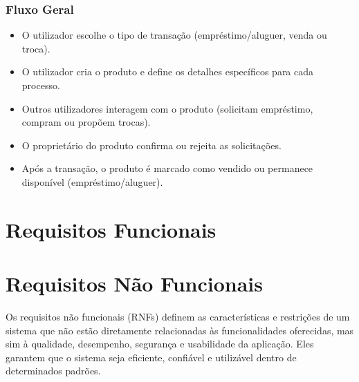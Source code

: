 \documentclass[a4paper, 12pt]{article} %
\begin{document}
\subsubsection{Fluxo Geral}
\begin{itemize}
	\item O utilizador escolhe o tipo de transação (empréstimo/aluguer, venda ou troca).
	\item O utilizador cria o produto e define os detalhes específicos para cada processo.
	\item Outros utilizadores interagem com o produto (solicitam empréstimo, compram ou propõem trocas).
	\item O proprietário do produto confirma ou rejeita as solicitações.
	\item Após a transação, o produto é marcado como vendido ou permanece disponível (empréstimo/aluguer).
\end{itemize}


\newpage
\section{Requisitos Funcionais}



\newpage
\section{Requisitos Não Funcionais}

Os requisitos não funcionais (RNFs) definem as características e restrições de um sistema que não estão diretamente relacionadas às funcionalidades oferecidas, mas sim à qualidade, desempenho, segurança e usabilidade da aplicação. Eles garantem que o sistema seja eficiente, confiável e utilizável dentro de determinados padrões.
\end{document}
